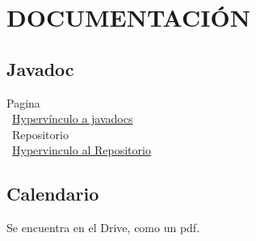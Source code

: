 \documentclass{report}
\begin{document}
\section{DOCUMENTACIÓN}
\subsection{Javadoc}
Pagina\\\
\href{https://cristinakris.github.io/Proyecto1-EDAII-Equipo3/}{Hypervínculo a javadocs}\\\
Repositorio\\\
\href{https://github.com/cristinaKris/Proyecto1-EDAII-Equipo3}{Hypervinculo al Repositorio}
   
   
\subsection{Calendario}
Se encuentra en el Drive, como un pdf.
\end{document}
